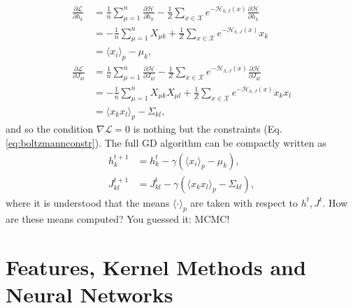 \documentclass{article}
\begin{document}
\begin{align}
    \frac{\partial \mathcal{L}}{\partial h_k}
    &=
    \frac{1}{n}
    \sum_{\mu=1}^{n}
    \frac{\partial \mathcal{H}}{\partial h_k}
    -
    \frac{1}{Z}
    \sum_{x\in\mathcal{X}}
    e^{-\mathcal{H}_{h,J}(x)}
    \frac{\partial \mathcal{H}}{\partial h_k} \\
    &=
    -\frac{1}{n}
    \sum_{\mu=1}^{n}
    X_{\mu k}
    +
    \frac{1}{Z}
    \sum_{x\in\mathcal{X}}
    e^{-\mathcal{H}_{h,J}(x)}
    x_k \\
    &=
    \langle x_i \rangle_p -\mu_k, \\
    \frac{\partial \mathcal{L}}{\partial J_{kl}}
    &=
    \frac{1}{n}
    \sum_{\mu=1}^{n}
    \frac{\partial \mathcal{H}}{\partial J_{kl}}
    -
    \frac{1}{Z}
    \sum_{x\in\mathcal{X}}
    e^{-\mathcal{H}_{h,J}(x)}
    \frac{\partial \mathcal{H}}{\partial J_{kl}} \\
    &=
    -\frac{1}{n}
    \sum_{\mu=1}^{n}
    X_{\mu k}X_{\mu l}
    +
    \frac{1}{Z}
    \sum_{x\in\mathcal{X}}
    e^{-\mathcal{H}_{h,J}(x)}
    x_k x_l \\
    &=
    \langle x_k x_l \rangle_p-\Sigma_{kl},
\end{align}
and so the condition $\nabla \mathcal{L} = 0$ is nothing but the constraints (Eq. \ref{eq:boltzmannconstr}). The full GD algorithm can be compactly written as
\begin{align}
    h_k^{t+1}
    &=
    h_k^{t} -\gamma (\langle x_i \rangle_p -\mu_k), \\
    J_{kl}^{t+1}
    &=
    J_{kl}^{t} -\gamma (\langle x_k x_l \rangle_p-\Sigma_{kl}),
\end{align}
where it is understood that the means $\langle\cdot\rangle_p$ are taken with respect to $h^{t},J^{t}$. How are these means computed? You guessed it: MCMC!
\section{Features, Kernel Methods and Neural Networks}
\end{document}
